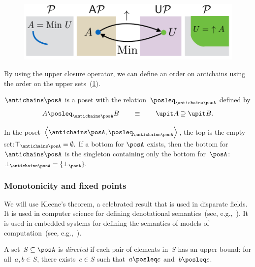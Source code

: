 \begin{figure}[h]
\begin{center}
    \includegraphics[scale=0.4]{papers/arxiv_submission_v6/gmcdp_antichains_upsets.pdf}
\end{center}
\caption{\label{fig:antichains_upsets}}
\end{figure}

By using the upper closure operator, we can define an order on antichains
using the order on the upper sets~(\cref{fig:antichains_upsets}).
\begin{lemma}
\label{lem:antichains-are-poset}$\antichains\posA$ is a poset with
the relation~$\posleq_{\antichains\posA}$ defined by
\[
A\posleq_{\antichains\posA}B\qquad\equiv\qquad\upit A\supseteq\upit B.
\]
\end{lemma}
In the poset $\left\langle \antichains\posA,\posleq_{\antichains\posA}\right\rangle $,
the top is the empty set:$\top_{\antichains\posA}=\emptyset.$ If
a bottom for $\posA$ exists, then the bottom for~$\antichains\posA$
is the singleton containing only the bottom for~$\posA$: $\bot_{\antichains\posA}=\{\bot_{\posA}\}.$


\subsubsection{Monotonicity and fixed points\label{sec:Monotonicity-and-fixed}}

We will use Kleene's theorem, a celebrated result that is used in
disparate fields. It is used in computer science for defining denotational
semantics~(see, e.g.,~\cite{manes86}). It is used in embedded systems
for defining the semantics of models of computation~(see, e.g.,~\cite{lee10}).

\begin{definition}
A set~$S\subseteq\posA$ is \emph{directed} if each pair of elements
in~$S$ has an upper bound: for all~$a,b\in S$, there exists~$c\in S$
such that~$a\posleq c$ and~$b\posleq c$.
\end{definition}


